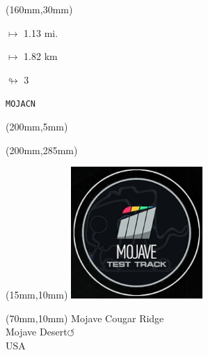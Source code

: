 \begin{textblock*}{40mm}(160mm,30mm)%
\Large
\par$\mapsto$ 1.13 mi.
\par$\mapsto$ 1.82 km
\par$\looparrowright$ 3
\par\hfill\tiny\tt MOJACN\\
\end{textblock*}
\begin{textblock*}{20mm}(200mm,5mm)%
\fbox{\thepage}
\label{MOJACN}
\end{textblock*}
\begin{textblock*}{20mm}(200mm,285mm)%
\fbox{\thepage}
\end{textblock*}

\null\newpage
\begin{textblock*}{50mm}(15mm,10mm)%
\includegraphics[width=50mm]{LG/MOJA.png}
\end{textblock*}
\begin{textblock*}{130mm}(70mm,10mm)%
{\fontsize{20}{20}\selectfont Mojave Cougar Ridge\\}
{\fontsize{16}{16}\selectfont Mojave Desert\hfill \huge$\circlearrowleft$\\}
{\fontsize{12}{12}\selectfont USA\\}
\end{textblock*}
